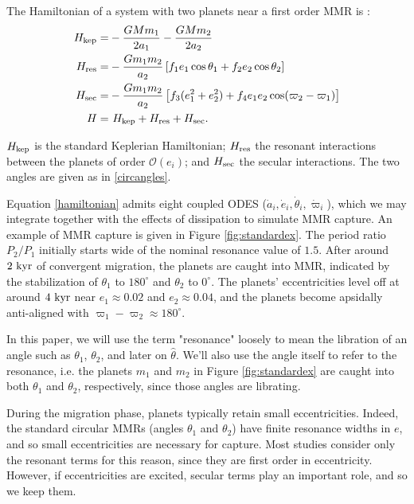 \documentclass{mnras}
\renewcommand{\O}{\mathcal{O}}
\begin{document}
The Hamiltonian of a system with two planets near a first order MMR is
\cite{murray_solar_2000}:
\begin{align}
\label{hamiltonian}
  H_{\rm kep} = & -\frac{G M m_{1}}{2 a_{1}}-\frac{G M m_{2}}{2 a_{2}}\nonumber\\
  H_{\rm res} = & -\frac{G m_{1} m_{2}}{a_{2}}
                  \left[
                  f_{1} e_{1} \cos \theta_{1} 
                  +f_{2} e_{2} \cos \theta_{2}\right]\nonumber\\
  H_{\rm sec} = &-\frac{G m_{1} m_{2}}{a_{2}}\left[f_{3} (e_1^2 + e_2^2)
                  +f_4e_1e_2\cos(\varpi_2-\varpi_1)
                  \right] \nonumber\\
  H = &~ H_{\rm kep} + H_{\rm res}+ H_{\rm sec}. 
\end{align}

\(H_{\rm kep}\) is the standard Keplerian Hamiltonian; \(H_{\rm res}\)
the resonant interactions between the planets of order
\(\O(e_i)\); and \(H_{\rm sec}\) the secular interactions.
The two angles are given as in \eqref{circangles}.

Equation \eqref{hamiltonian} admits eight coupled ODES (\(\dot a_i, \dot
e_i, \dot\theta_i, \dot\varpi_i\)), which we may integrate together
with the effects of dissipation to simulate MMR capture.  An example
of MMR capture is given in Figure \ref{fig:standardex}.  The period
ratio \(P_2/P_1\) initially starts wide of the nominal resonance value
of \(1.5\).  After around \(2~\rm{kyr}\) of convergent migration, the
planets are caught into MMR, indicated by the stabilization of
\(\theta_1\) to \(180^\circ\) and \(\theta_2\) to \(0^\circ\).  The planets'
eccentricities level off at around \(4~\rm{kyr}\) near \(e_1\approx 0.02\)
and \(e_2\approx0.04\), and the planets become apsidally anti-aligned
with \(\varpi_1-\varpi_2\approx 180^\circ\).

In this paper, we will use the term "resonance" loosely to mean the
libration of an angle such as \(\theta_1\), \(\theta_2\), and later on
\(\hat\theta\).  We'll also use the angle itself to refer to the
resonance, i.e. the planets \(m_1\) and \(m_2\) in Figure
\ref{fig:standardex} are caught into both \(\theta_1\) and \(\theta_2\),
respectively, since those angles are librating.

During the migration phase, planets typically retain small
eccentricities. Indeed, the standard circular MMRs (angles \(\theta_1\)
and \(\theta_2\)) have finite resonance widths in \(e\), and so small
eccentricities are necessary for capture.  Most studies consider only
the resonant terms for this reason, since they are first order in
eccentricity.  However, if eccentricities are excited, secular terms
play an important role, and so we keep them.
\end{document}
